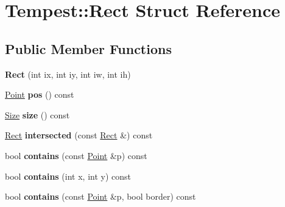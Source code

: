 \hypertarget{struct_tempest_1_1_rect}{\section{Tempest\+:\+:Rect Struct Reference}
\label{struct_tempest_1_1_rect}
}
\subsection*{Public Member Functions}
\begin{DoxyCompactItemize}
\item 
\hypertarget{struct_tempest_1_1_rect_acfef402fb7d00f16b40dffe32a204cd9}{{\bfseries Rect} (int ix, int iy, int iw, int ih)}\label{struct_tempest_1_1_rect_acfef402fb7d00f16b40dffe32a204cd9}

\item 
\hypertarget{struct_tempest_1_1_rect_af715a4192d716926809188dbf7ada605}{\hyperlink{struct_tempest_1_1_point}{Point} {\bfseries pos} () const }\label{struct_tempest_1_1_rect_af715a4192d716926809188dbf7ada605}

\item 
\hypertarget{struct_tempest_1_1_rect_a463b56dfc8a8449ca4f9eb69f4e114e6}{\hyperlink{struct_tempest_1_1_size}{Size} {\bfseries size} () const }\label{struct_tempest_1_1_rect_a463b56dfc8a8449ca4f9eb69f4e114e6}

\item 
\hypertarget{struct_tempest_1_1_rect_ad58e9a822ba3529a194bca4070f77645}{\hyperlink{struct_tempest_1_1_rect}{Rect} {\bfseries intersected} (const \hyperlink{struct_tempest_1_1_rect}{Rect} \&) const }\label{struct_tempest_1_1_rect_ad58e9a822ba3529a194bca4070f77645}

\item 
\hypertarget{struct_tempest_1_1_rect_ab0c2593dcd501a174b90d94b73be91c4}{bool {\bfseries contains} (const \hyperlink{struct_tempest_1_1_point}{Point} \&p) const }\label{struct_tempest_1_1_rect_ab0c2593dcd501a174b90d94b73be91c4}

\item 
\hypertarget{struct_tempest_1_1_rect_ab5bbeca3b5f0a2d560b476aa04cf3b9e}{bool {\bfseries contains} (int x, int y) const }\label{struct_tempest_1_1_rect_ab5bbeca3b5f0a2d560b476aa04cf3b9e}

\item 
\hypertarget{struct_tempest_1_1_rect_ae5cb2facdb0da5dc79aa67310431539f}{bool {\bfseries contains} (const \hyperlink{struct_tempest_1_1_point}{Point} \&p, bool border) const }\label{struct_tempest_1_1_rect_ae5cb2facdb0da5dc79aa67310431539f}


\end{DoxyCompactItemize}
